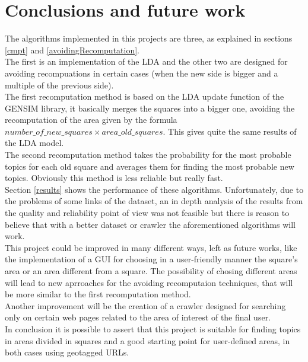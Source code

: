 \documentclass{sig-alternate-05-2015}
\begin{document}
\section{Conclusions and future work}
The algorithms implemented in this projects are three, as explained in sections \ref{cmpt} and \ref{avoidingRecomputation}.\\
The first is an implementation of the LDA and the other two are designed for avoiding recompuations in certain cases (when the new side is bigger and a multiple of the previous side). \\
The first recomputation method is based on the LDA update function of the GENSIM library, it basically merges the squares into a bigger one, avoiding the recomputation of the area given by the formula $ number\_of\_new\_squares \times area\_old\_squares $. This gives quite the same results of the LDA model.\\
The second recomputation method takes the probability for the most probable topics for each old square and averages them for finding the most probable new topics. Obviously this method is less reliable but really fast.\\
Section \ref{results} shows the performance of these algorithms. Unfortunately, due to the problems of some links of the dataset, an in depth analysis of the results from the quality and reliability point of view was not feasible but there is reason to believe that with a better dataset or crawler the aforementioned algorithms will work.\\
This project could be improved in many different ways, left as future works, like the implementation of a GUI for choosing in a user-friendly manner the square's area or an area different from a square. The possibility of chosing different areas will lead to new aprroaches for the avoiding recomputaion techniques, that will be more similar to the first recomputation method.\\
Another improvement will be the creation of a crawler designed for searching only on certain web pages related to the area of interest of the final user.\\
In conclusion it is possible to assert that this project is suitable for finding topics in areas divided in squares and a good starting point for user-defined areas, in both cases using geotagged URLs.\\





%



%
%
\end{document}
